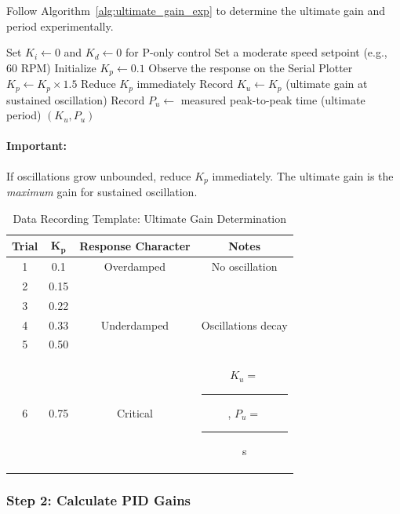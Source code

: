 Follow Algorithm~\ref{alg:ultimate_gain_exp} to determine the ultimate gain and period experimentally.

\begin{algorithm}
\caption{Experimental Determination of Ultimate Gain}
\label{alg:ultimate_gain_exp}
\begin{algorithmic}[1]
\State Set $K_i \gets 0$ and $K_d \gets 0$ for P-only control
\State Set a moderate speed setpoint (e.g., 60 RPM)
\State Initialize $K_p \gets 0.1$
    \State Observe the response on the Serial Plotter
        \State $K_p \gets K_p \times 1.5$
    \EndIf
        \State Reduce $K_p$ immediately
    \EndIf
\EndWhile
\State Record $K_u \gets K_p$ (ultimate gain at sustained oscillation)
\State Record $P_u \gets$ measured peak-to-peak time (ultimate period)
\State \Return $(K_u, P_u)$
\end{algorithmic}
\end{algorithm}

\paragraph{Important:} If oscillations grow unbounded, reduce $K_p$ immediately. The ultimate gain is the \textit{maximum} gain for sustained oscillation.

\begin{table}[htbp]
\centering
\caption{Data Recording Template: Ultimate Gain Determination}
\label{tab:data_template}
\begin{tabular}{cccc}
\toprule
\textbf{Trial} & $\boldsymbol{K_p}$ & \textbf{Response Character} & \textbf{Notes} \\
\midrule
1 & 0.1 & Overdamped & No oscillation \\
2 & 0.15 & & \\
3 & 0.22 & & \\
4 & 0.33 & Underdamped & Oscillations decay \\
5 & 0.50 & & \\
6 & 0.75 & Critical & $K_u = $ \rule{1cm}{0.4pt}, $P_u = $ \rule{1cm}{0.4pt} s \\
\bottomrule
\end{tabular}
\end{table}

\subsubsection{Step 2: Calculate PID Gains}

